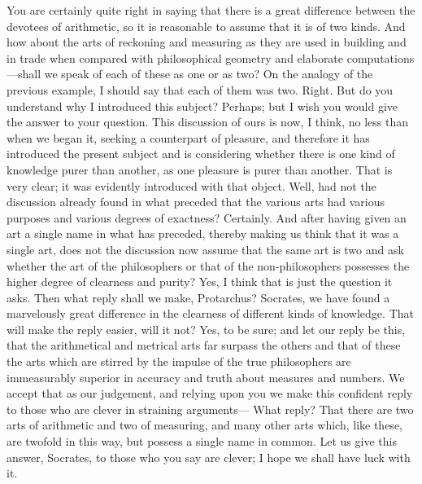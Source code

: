 \documentclass[letterpaper,12pt]{article}
\newcommand{\stephpag}[1]{\marginnote{\small\itshape\fontfamily{ppl}\selectfont #1}}
\begin{document}
\begin{drama}
\protarchusspeaks
You are certainly quite right in saying that there is a great difference between the devotees of arithmetic, so it is reasonable to assume that it is of two kinds.
\socratesspeaks
And how about the arts of reckoning and measuring as they are used in building and in trade when compared with philosophical geometry \stephpag{57 a} and elaborate computations---shall we speak of each of these as one or as two?
\protarchusspeaks
On the analogy of the previous example, I should say that each of them was two.
\socratesspeaks
Right. But do you understand why I introduced this subject?
\protarchusspeaks
Perhaps; but I wish you would give the answer to your question.
\socratesspeaks
This discussion of ours is now, I think, no less than when we began it, seeking a counterpart of pleasure, \stephpag{b} and therefore it has introduced the present subject and is considering whether there is one kind of knowledge purer than another, as one pleasure is purer than another.
\protarchusspeaks
That is very clear; it was evidently introduced with that object.
\socratesspeaks
Well, had not the discussion already found in what preceded that the various arts had various purposes and various degrees of exactness?
\protarchusspeaks
Certainly.
\socratesspeaks
And after having given an art a single name in what has preceded, thereby making us think that it was a single art, \stephpag{c} does not the discussion now assume that the same art is two and ask whether the art of the philosophers or that of the non-philosophers possesses the higher degree of clearness and purity?
\protarchusspeaks
Yes, I think that is just the question it asks.
\socratesspeaks
Then what reply shall we make, Protarchus?
\protarchusspeaks
Socrates, we have found a marvelously great difference in the clearness of different kinds of knowledge.
\socratesspeaks
That will make the reply easier, will it not?
\protarchusspeaks
Yes, to be sure; and let our reply be this, that the arithmetical and metrical arts far surpass the others and that of these \stephpag{d} the arts which are stirred by the impulse of the true philosophers are immeasurably superior in accuracy and truth about measures and numbers.
\socratesspeaks
We accept that as our judgement, and relying upon you we make this confident reply to those who are clever in straining arguments---
\protarchusspeaks
What reply?
\socratesspeaks
That there are two arts of arithmetic and two of measuring, and many other arts which, like these, are twofold in this way, but possess a single name in common. \stephpag{e}
\protarchusspeaks
Let us give this answer, Socrates, to those who you say are clever; I hope we shall have luck with it.

\end{drama}
\end{document}
